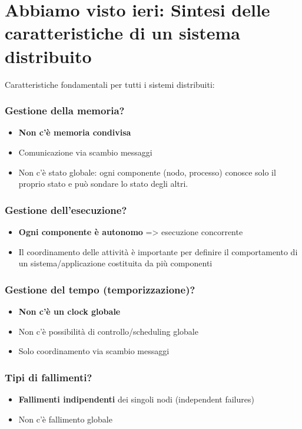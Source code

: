 \section{Abbiamo visto ieri: Sintesi delle caratteristiche di un sistema distribuito}
Caratteristiche fondamentali per tutti i sistemi distribuiti:
\subsubsection{Gestione della memoria?}
\begin{itemize}
    \item \textbf{Non c'è memoria condivisa}
    \item Comunicazione via scambio messaggi
    \item Non c'è stato globale: ogni componente (nodo, processo) conosce solo il proprio stato e può sondare lo stato degli altri.
\end{itemize}

\subsubsection{Gestione dell'esecuzione?}
\begin{itemize}
    \item \textbf{Ogni componente è autonomo} => esecuzione concorrente
    \item Il coordinamento delle attività è importante per definire il comportamento di un sistema/applicazione costituita da più componenti
\end{itemize}

\subsubsection{Gestione del tempo (temporizzazione)?}
\begin{itemize}
    \item \textbf{Non c'è un clock globale}
    \item Non c'è possibilità di controllo/scheduling globale
    \item Solo coordinamento via scambio messaggi
\end{itemize}

\subsubsection{Tipi di fallimenti?}
\begin{itemize}
    \item \textbf{Fallimenti indipendenti} dei singoli nodi (independent failures)
    \item Non c'è fallimento globale
\end{itemize}

